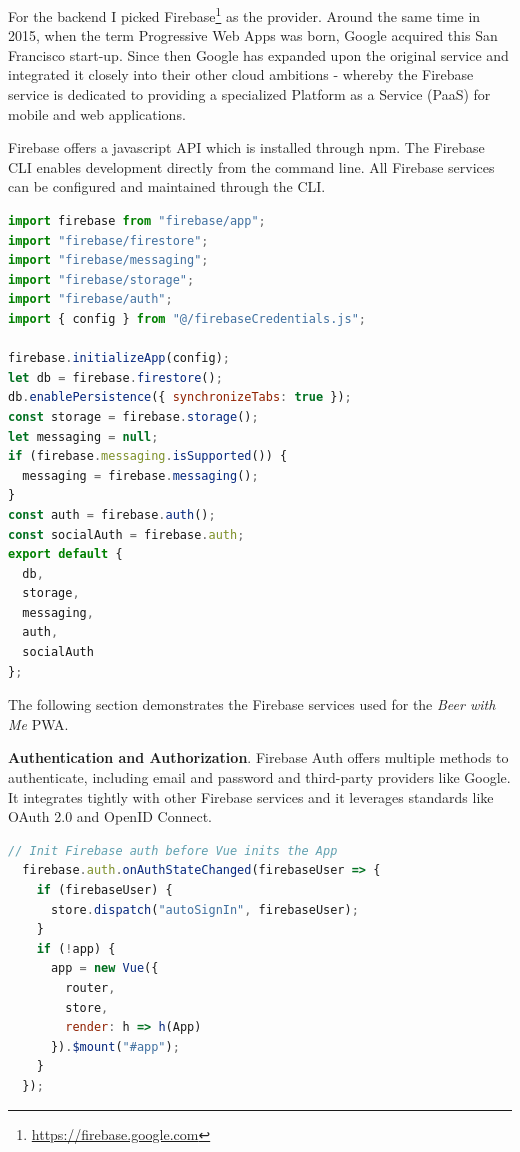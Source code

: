 For the backend I picked Firebase\footnote{\url{https://firebase.google.com}} as the provider. Around the same time in 2015, when the term Progressive Web Apps was born, Google acquired this San Francisco start-up. Since then Google has expanded upon the original service and integrated it closely into their other cloud ambitions - whereby the Firebase service is dedicated to providing a specialized Platform as a Service (PaaS) for mobile and web applications.

Firebase offers a javascript API which is installed through npm. The Firebase CLI enables development directly from the command line. All Firebase services can be configured and maintained through the CLI.

\begin{lstlisting}[language=JavaScript, caption=Firebase configuration and services (firebaseConfig.js), label=lst:firebase-conf]
import firebase from "firebase/app";
import "firebase/firestore";
import "firebase/messaging";
import "firebase/storage";
import "firebase/auth";
import { config } from "@/firebaseCredentials.js";

firebase.initializeApp(config);
let db = firebase.firestore();
db.enablePersistence({ synchronizeTabs: true });
const storage = firebase.storage();
let messaging = null;
if (firebase.messaging.isSupported()) {
  messaging = firebase.messaging();
}
const auth = firebase.auth();
const socialAuth = firebase.auth;
export default {
  db,
  storage,
  messaging,
  auth,
  socialAuth
};
\end{lstlisting}


The following section demonstrates the Firebase services used for the \textit{Beer with Me} PWA.

\textbf{Authentication and Authorization}. Firebase Auth offers multiple methods to authenticate, including email and password and third-party providers like Google. It integrates tightly with other Firebase services and it leverages standards like OAuth 2.0 and OpenID Connect.

\begin{lstlisting}[language=JavaScript, caption=Firebase Auth initiation using VueJS (main.js), label=lst:firebase-auth]
  // Init Firebase auth before Vue inits the App
  firebase.auth.onAuthStateChanged(firebaseUser => {
    if (firebaseUser) {
      store.dispatch("autoSignIn", firebaseUser);
    }
    if (!app) {
      app = new Vue({
        router,
        store,
        render: h => h(App)
      }).$mount("#app");
    }
  });
\end{lstlisting}

